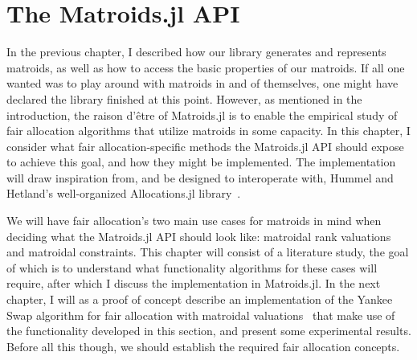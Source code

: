 \chapter{The Matroids.jl API}
In the previous chapter, I described how our library generates and represents matroids, as well as how to access the basic properties of our matroids. If all one wanted was to play around with matroids in and of themselves, one might have declared the library finished at this point. However, as mentioned in the introduction, the raison d'être of Matroids.jl is to enable the empirical study of fair allocation algorithms that utilize matroids in some capacity. In this chapter, I consider what fair allocation-specific methods the Matroids.jl API should expose to achieve this goal, and how they might be implemented. The implementation will draw inspiration from, and be designed to interoperate with, Hummel and Hetland's well-organized Allocations.jl library~\cite{Hetland_Allocations_jl_2022}. 

We will have fair allocation's two main use cases for matroids in mind when deciding what the Matroids.jl API should look like: matroidal rank valuations and matroidal constraints. This chapter will consist of a literature study, the goal of which is to understand what functionality algorithms for these cases will require, after which I discuss the implementation in Matroids.jl. In the next chapter, I will as a proof of concept describe an implementation of the Yankee Swap algorithm for fair allocation with matroidal valuations~\cite{viswanathan2023yankee} that make use of the functionality developed in this section, and present some experimental results. Before all this though, we should establish the required fair allocation concepts.
